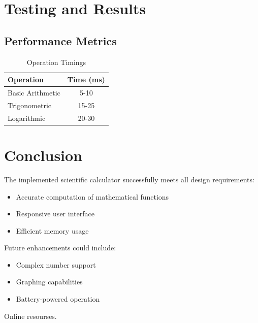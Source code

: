 \documentclass[12pt,a4paper]{article}
\numberwithin{equation}{section}
\numberwithin{figure}{section}
\numberwithin{table}{section}
\begin{document}
\section{Testing and Results}

\subsection{Performance Metrics}
\begin{table}[H]
    \centering
    \caption{Operation Timings}
    \begin{tabular}{lc}
        \toprule
        \textbf{Operation} & \textbf{Time (ms)} \\
        \midrule
        Basic Arithmetic & 5-10 \\
        Trigonometric & 15-25 \\
        Logarithmic & 20-30 \\
        \bottomrule
    \end{tabular}
\end{table}



\section{Conclusion}
The implemented scientific calculator successfully meets all design requirements:
\begin{itemize}
    \item Accurate computation of mathematical functions
    \item Responsive user interface
    \item Efficient memory usage
\end{itemize}

Future enhancements could include:
\begin{itemize}
    \item Complex number support
    \item Graphing capabilities
    \item Battery-powered operation
\end{itemize}

\begin{thebibliography}{9}
Online resourses.
\end{thebibliography}
\end{document}
